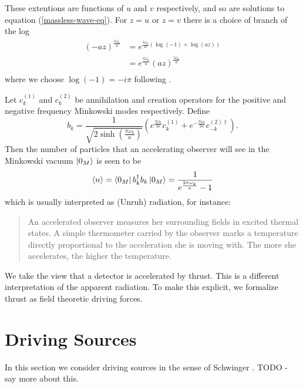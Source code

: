 \documentclass[12pt,a4paper]{article}
\begin{document}
These extentions are functions of $u$ and $v$ respectively, and so are solutions to equation (\ref{massless-wave-eq}).  For $z = u$ or $z = v$ there is a choice of branch of the log
\begin{equation}
\begin{aligned}
  {(-az)}^{\frac{i\omega_k}{a}} &= e^{\frac{i\omega_k}{a} \left(\log(-1) + \log(az)\right)}  \\
                           &= e^{\frac{\pi \omega_k}{a}} {(az)}^{\frac{i\omega_k}{a}} \\
\end{aligned}
\label{factor}
\end{equation}
where we choose $\log(-1) = -i \pi$ following \cite{Frodden}. 

Let $c_k^{(1)}$ and $c_k^{(2)}$ be annihilation and creation operators for the positive and negative frequency Minkowski modes respectively.  Define
\begin{equation}
  b_k = \frac{1}{\sqrt{2 \sinh\left(\frac{\pi \omega_k}{a}\right)}} \left( e^{\frac{\pi\omega_k}{2a}} c_k^{(1)} + e^{-\frac{\pi\omega_k}{2a}} c_{-k}^{(2) \dagger} \right).
\end{equation}
Then the number of particles that an accelerating observer will see in the Minkowski vacuum $\ket{0_M}$ is seen to be 
\begin{equation}
\label{radeq}
\braket{n} = \bra{0_M} b_k^\dagger b_k \ket{0_M} = \frac{1}{e^{\frac{2 \pi \omega_k}{a}}-1}
\end{equation}
which is usually interpreted as (Unruh) radiation, for instance:

\begin{quote}
  An accelerated observer measures her surrounding fields in excited thermal states. A simple thermometer carried by the observer marks a temperature directly proportional to the acceleration she is moving with. The more she accelerates, the higher the temperature.
\end{quote}
We take the view that a detector is accelerated by thrust.  This is a different interpretation of the apparent radiation.  To make this explicit, we formalize thrust as field theoretic driving forces.


\section{Driving Sources}
In this section we consider driving sources in the sense of Schwinger \cite{schwinger}. TODO - say more about this.
\end{document}
